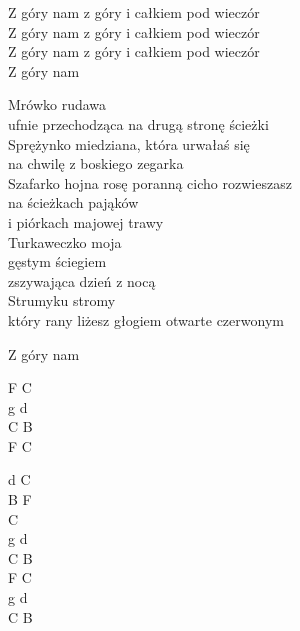 \begin{text}
    \vin Z góry nam z góry i całkiem pod wieczór\\
    \vin Z góry nam z góry i całkiem pod wieczór\\
    \vin Z góry nam z góry i całkiem pod wieczór\\
    \vin Z góry nam

    Mrówko rudawa\\
    ufnie przechodząca na drugą stronę ścieżki\\
    Sprężynko miedziana, która urwałaś się\\
    na chwilę z boskiego zegarka\\
    Szafarko hojna rosę poranną cicho rozwieszasz\\
    na ścieżkach pająków\\
    i piórkach majowej trawy\\
    Turkaweczko moja\\
    gęstym ściegiem\\
    zszywająca dzień z nocą\\
    Strumyku stromy\\
    który rany liżesz głogiem otwarte czerwonym

    \vin Z góry nam
\end{text}
\begin{chord}
    F C\\
    g d\\
    C B\\
    F C

    d C\\
    B F\\
    C\\
    g d\\
    C B\\
    F C\\
    g d\\
    C B\\
\end{chord}
